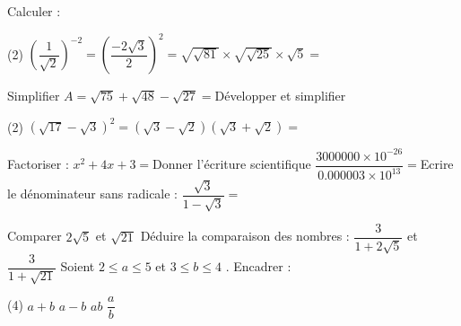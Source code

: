\documentclass[a4paper,addpoints,12pt]{exam}
\begin{document}
\examen[prv=true,date= 2024]

\begin{exo}[7]
\begin{questions}
\question[2]Calculer :\droppoints
\begin{tasks}(2)
\task[] $\left(\dfrac{1}{\sqrt{2}}\right)^{-2}=$\anserline[1]
\task[] $\left(\dfrac{-2\sqrt{3}}{2}\right)^{2}=$\anserline[2]
\task*[] $\sqrt{\sqrt{81}}\times \sqrt{\sqrt{25}}\times\sqrt{5}=$\anserline[3]
\end{tasks}
\question[1]Simplifier \droppoints
$A=\sqrt{75}+\sqrt{48}-\sqrt{27}=$\anserline[3]
\question[1]Développer et simplifier\droppoints
\begin{tasks}(2)
\task[] $\left(\sqrt{17}-\sqrt{3}\right)^{2}=$\anserline[2]
\task[] $\left(\sqrt{3}-\sqrt{2}\right)\left(\sqrt{3}+\sqrt{2}\right)=$\anserline[2]
\end{tasks}
\question[1]Factoriser :\droppoints
$x^{2}+4x+3=$\anserline[2]
\question[1]Donner l'écriture scientifique\droppoints
$\dfrac{3000000\times 10^{-26}}{0.000003\times 10^{13}}=$\anserline[2]
\question[1]Ecrire le dénominateur sans radicale :\droppoints
$\dfrac{\sqrt{3}}{1-\sqrt{3}}=$\anserline[2]
\end{questions}
\end{exo}

\begin{exo}[4]
\begin{questions}
\question[1]Comparer $2\sqrt{5}$ et $\sqrt{21}$\droppoints
\anserline[2]
\question[1]Déduire la comparaison des nombres : 
$\dfrac{3}{1+2\sqrt{5}}$ et $\dfrac{3}{1+\sqrt{21}}$\droppoints
\anserline[4]
\question[2]Soient $2\leq a\leq 5$ et $3\leq b\leq 4$ . Encadrer :\droppoints
\begin{tasks}(4)
\task[] $a+b$\newline{}
\task[] $a-b$\newline{}
\task[] $ab$\newline{}
\task[] $\dfrac{a}{b}$\newline {}
\end{tasks}
\end{questions}
\end{exo}
\end{document}
